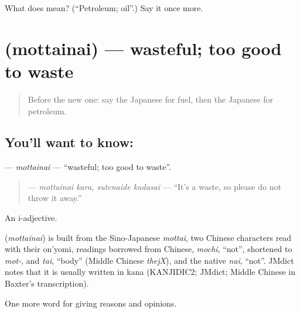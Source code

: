 \begin{tcolorbox}[breakable,colback=teal!4,colframe=teal!35!black,title={Before you move on}]
What does  mean? (\textquotedblleft{}Petroleum; oil\textquotedblright{}.) Say it once more.
\end{tcolorbox}
\section[\texorpdfstring{\ja{もったいない} (mottainai)}{もったいない (mottainai)}]{ (mottainai) — wasteful; too good to waste}

\label{lesson:JA-C337-mottainai}



\begin{quote}
Before the new one: say the Japanese for fuel, then the Japanese for petroleum.
\end{quote}

\subsection*{You'll want to know: }
\textbf{} — \emph{mottainai} — \textquotedblleft{}wasteful; too good to waste\textquotedblright{}.

\begin{quote}
\textbf{ } — \emph{mottainai kara, sutenaide kudasai} — \textquotedblleft{}It's a waste, so please do not throw it away.\textquotedblright{}
\end{quote}

An i-adjective.

\begin{cousinweb}
\textbf{} (\emph{mottainai}) is built from the Sino-Japanese \emph{mottai}, two Chinese characters read with their on'yomi, readings borrowed from Chinese, \emph{mochi}, \textquotedblleft{}not\textquotedblright{}, shortened to \emph{mot-}, and \emph{tai}, \textquotedblleft{}body\textquotedblright{} (Middle Chinese \emph{thejX}), and the native \emph{nai}, \textquotedblleft{}not\textquotedblright{}. JMdict notes that it is usually written in kana (KANJIDIC2; JMdict; Middle Chinese in Baxter's transcription).
\end{cousinweb}

\begin{grammarlens}[title={What you've built}]
One more word for giving reasons and opinions.
\end{grammarlens}

